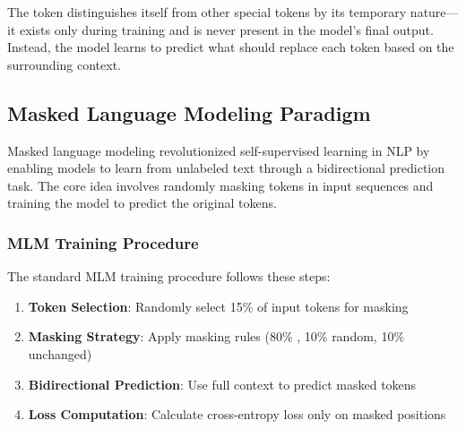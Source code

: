 The \mask{} token distinguishes itself from other special tokens by its temporary nature—it exists only during training and is never present in the model's final output. Instead, the model learns to predict what should replace each \mask{} token based on the surrounding context.

\subsection{Masked Language Modeling Paradigm}

Masked language modeling revolutionized self-supervised learning in NLP by enabling models to learn from unlabeled text through a bidirectional prediction task. The core idea involves randomly masking tokens in input sequences and training the model to predict the original tokens.

\subsubsection{MLM Training Procedure}

The standard MLM training procedure follows these steps:

\begin{enumerate}
\item \textbf{Token Selection}: Randomly select 15\% of input tokens for masking
\item \textbf{Masking Strategy}: Apply masking rules (80\% \mask{}, 10\% random, 10\% unchanged)
\item \textbf{Bidirectional Prediction}: Use full context to predict masked tokens
\item \textbf{Loss Computation}: Calculate cross-entropy loss only on masked positions
\end{enumerate}

